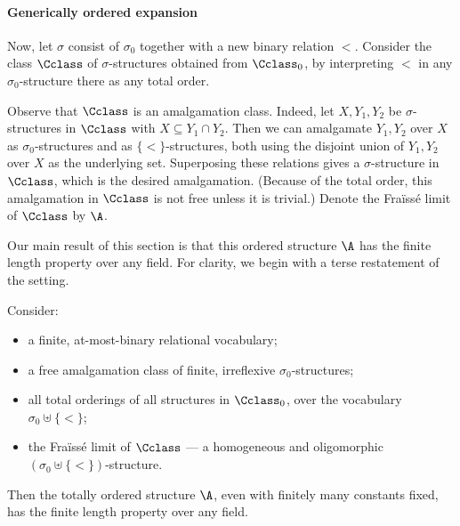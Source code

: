 \paragraph*{Generically ordered expansion}
Now, let $\sigma$ consist of $\sigma_0$ together with a new binary relation $<$.
Consider the class $\Cclass$ of $\sigma$-structures obtained from $\Cclass_0$, 
by interpreting $<$ in any $\sigma_0$-structure there as any total order.

Observe that $\Cclass$ is an amalgamation class.
Indeed, let $X, Y_1, Y_2$ be $\sigma$-structures in $\Cclass$ with $X \subseteq Y_1 \cap Y_2$.
Then we can amalgamate $Y_1, Y_2$ over $X$ as $\sigma_0$-structures and as $\{<\}$-structures, 
both using the disjoint union of $Y_1, Y_2$ over $X$ as the underlying set. 
Superposing these relations gives a $\sigma$-structure in $\Cclass$, which is the desired amalgamation.
(Because of the total order, this amalgamation in $\Cclass$ is not free unless it is trivial.)
Denote the Fraïssé limit of $\Cclass$ by $\A$.

Our main result of this section is that this ordered structure $\A$ has the finite length property over any field.
For clarity, we begin with a terse restatement of the setting.


\begin{theorem}\label{thm:ordered-free-amalg-has-finite-length}
    Consider:
    \begin{itemize}
        \item[$\sigma_0$] a finite, at-most-binary relational vocabulary;
        \item[$\Cclass_0$] a free amalgamation class of finite, irreflexive $\sigma_0$-structures;
        \item[$\Cclass$] all total orderings of all structures in $\Cclass_0$, over the vocabulary $\sigma_0 \uplus \{<\}$;
        \item[$\A$] the Fraïssé limit of $\Cclass$ --- a homogeneous and oligomorphic $(\sigma_0 \uplus \{<\})$-structure.
    \end{itemize}
    Then the totally ordered structure $\A$, even with finitely many constants fixed, has the finite length property over any field.
\end{theorem}

